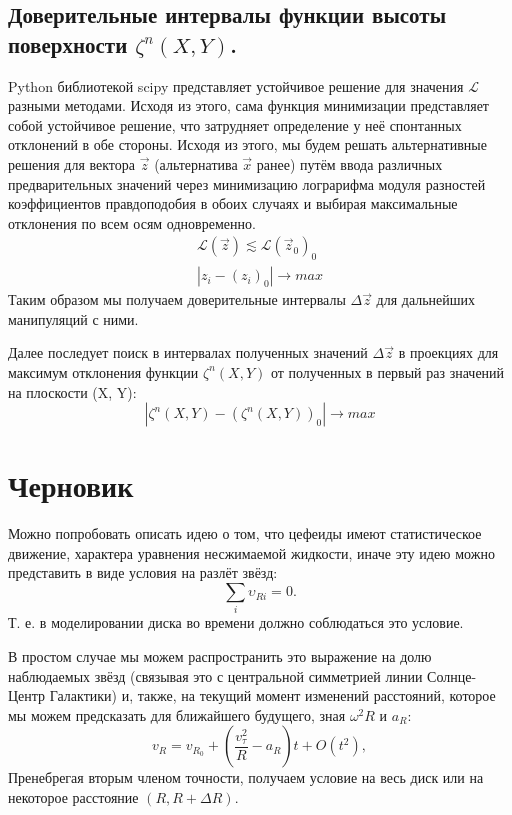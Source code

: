 \documentclass[a4paper,12pt]{article}
\begin{document}
\subsection{Доверительные интервалы функции высоты поверхности $\zeta^n(X, Y)$.}
Python библиотекой scipy представляет устойчивое решение для значения $\mathcal{L}$
разными методами.
Исходя из этого, сама функция минимизации представляет собой устойчивое решение, что затрудняет определение у неё спонтанных отклонений в обе стороны. Исходя из этого, мы будем решать альтернативные решения для вектора $\vec{z}$ (альтернатива $\vec{x}$ ранее) путём ввода различных предварительных значений через минимизацию лограрифма модуля разностей коэффициентов правдоподобия в обоих случаях и выбирая максимальные отклонения по всем осям одновременно.
\begin{gather}
	\mathcal{L}(\vec{z}) \lesssim \mathcal{L}(\vec{z}_0)_0 \\
	|z_i - (z_{i})_0| \rightarrow max
\end{gather}
Таким образом мы получаем доверительные интервалы $\Delta \vec{z}$ для дальнейших манипуляций с ними.

Далее последует поиск в интервалах полученных значений $\Delta \vec{z}$ в проекциях для максимум отклонения функции $\zeta^n(X, Y)$ от полученных в первый раз значений на плоскости (X, Y):
\begin{equation}
	|\zeta^n(X, Y) - (\zeta^n(X, Y))_0| \rightarrow max
\end{equation}
\section*{Черновик}

Можно попробовать описать идею о том, что цефеиды имеют статистическое движение, характера уравнения несжимаемой жидкости, иначе эту идею можно представить в виде условия на разлёт звёзд:
\begin{equation}
	\sum_i \upsilon_{Ri} = 0.
\end{equation}
Т. е. в моделировании диска во времени должно соблюдаться это условие.


В простом случае мы можем распространить это выражение на долю наблюдаемых звёзд (связывая это с центральной симметрией линии Солнце-Центр Галактики) и, также, на текущий момент изменений расстояний, которое мы можем предсказать для ближайшего будущего, зная $\omega^2 R$ и $a_R$:
\begin{equation}
	v_R = v_{R_0} + (\frac{v_\tau^2}{R} - a_R)t + O(t^2),
\end{equation}
Пренебрегая вторым членом точности, получаем условие на весь диск или на некоторое расстояние $(R, R+\Delta R)$.
\end{document}
